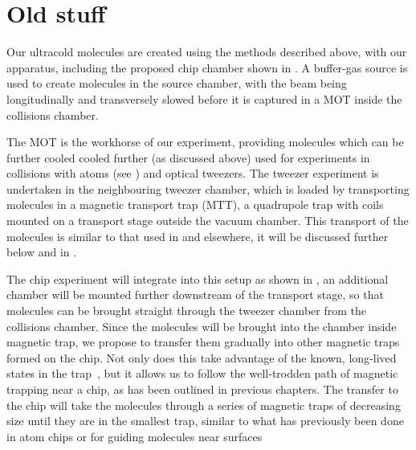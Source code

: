 
\section{Old stuff}
\label{overview:overview}

Our ultracold molecules are created using the methods described above, with our
apparatus, including the proposed chip chamber shown in
. A buffer-gas source is used to create
\CaF{} molecules in the source chamber, with the beam being longitudinally and
transversely slowed before it is captured in a MOT inside the collisions
chamber.


The \CaF{} MOT is the workhorse of our experiment, providing molecules which
can be further cooled cooled further (as discussed above) used for experiments
in collisions with \Rb{} atoms (see ) and optical tweezers. The tweezer experiment is
undertaken in the neighbouring tweezer chamber, which is loaded by transporting
molecules in a magnetic transport trap (MTT), a quadrupole trap with coils
mounted on a transport stage outside the vacuum chamber. This transport of the
molecules is similar to that used in
 and elsewhere, it will be
discussed further below and in .

The chip experiment will integrate into this setup as shown in
, an additional chamber will be mounted
further downstream of the transport stage, so that molecules can be brought
straight through the tweezer chamber from the collisions chamber.  Since the
molecules will be brought into the chamber inside magnetic trap, we propose to
transfer them gradually into other magnetic traps formed on the chip.
%
Not only does this take advantage of the known, long-lived \CaF{} states in the
trap~\cite{WilliamsMagnetic2018}, but it allows us to follow the well-trodden
path of magnetic trapping near a chip, as has been outlined in previous
chapters.  The transfer to the chip will take the molecules through a series of
magnetic traps of decreasing size until they are in the smallest trap, similar
to what has previously been done in atom chips \cite{Reichel1999} or for
guiding molecules near surfaces \cite{Meek2009}


